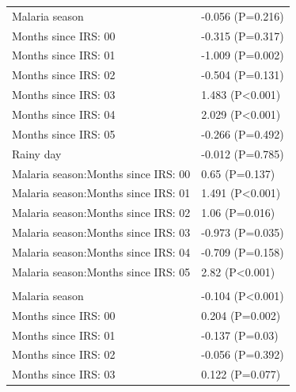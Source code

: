 \documentclass[]{article}
\begin{document}
\begin{longtable}[t]{ll}
\hspace{1em}Malaria season & -0.056 (P=0.216)\\
\hspace{1em}Months since IRS: 00 & -0.315 (P=0.317)\\
\hspace{1em}Months since IRS: 01 & -1.009 (P=0.002)\\
\hspace{1em}Months since IRS: 02 & -0.504 (P=0.131)\\
\hspace{1em}Months since IRS: 03 & 1.483 (P<0.001)\\
\hspace{1em}Months since IRS: 04 & 2.029 (P<0.001)\\
\hspace{1em}Months since IRS: 05 & -0.266 (P=0.492)\\
\hspace{1em}Rainy day & -0.012 (P=0.785)\\
\hspace{1em}Malaria season:Months since IRS: 00 & 0.65 (P=0.137)\\
\hspace{1em}Malaria season:Months since IRS: 01 & 1.491 (P<0.001)\\
\hspace{1em}Malaria season:Months since IRS: 02 & 1.06 (P=0.016)\\
\hspace{1em}Malaria season:Months since IRS: 03 & -0.973 (P=0.035)\\
\hspace{1em}Malaria season:Months since IRS: 04 & -0.709 (P=0.158)\\
\hspace{1em}Malaria season:Months since IRS: 05 & 2.82 (P<0.001)\\
\addlinespace[1.5em]
\multicolumn{2}{l}{\textbf{Temporary field worker}}\\
\hspace{1em}Malaria season & -0.104 (P<0.001)\\
\hspace{1em}Months since IRS: 00 & 0.204 (P=0.002)\\
\hspace{1em}Months since IRS: 01 & -0.137 (P=0.03)\\
\hspace{1em}Months since IRS: 02 & -0.056 (P=0.392)\\
\hspace{1em}Months since IRS: 03 & 0.122 (P=0.077)\\

\end{longtable}
\end{document}
